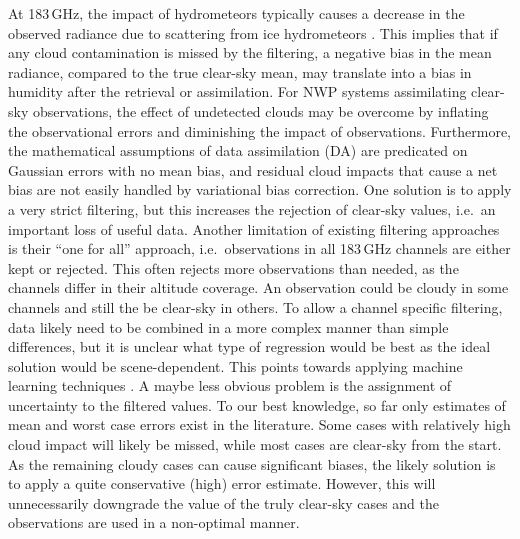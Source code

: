 \documentclass[amt, manuscript]{copernicus}
\begin{document}
At 183\,GHz, the impact of hydrometeors typically causes a decrease in the observed radiance due to scattering from ice hydrometeors \citep[e.g.,][]{barlakas:three:20}. This implies that if any cloud contamination is missed by the filtering, a negative bias in the mean radiance, compared to the true clear-sky mean, may translate into a bias in humidity after the retrieval or assimilation. For NWP systems assimilating clear-sky observations, the effect of undetected clouds may be overcome by inflating the observational errors and diminishing the impact of observations. Furthermore, the mathematical assumptions of data assimilation (DA) are predicated on Gaussian errors with no mean bias, and residual cloud impacts that cause a net bias are not easily handled by variational bias correction. One solution is to apply a very strict filtering, but this increases the rejection of clear-sky values, i.e.\ an important loss of useful data. Another limitation of existing filtering approaches is their ``one for all'' approach, i.e.\ observations in all 183\,GHz channels are either kept or rejected. This often rejects more observations than needed, as the channels differ in their altitude coverage. An observation could be cloudy in some channels and still the be clear-sky in others. To allow a channel specific filtering, data likely need to be combined in a more complex manner than simple differences, but it is unclear what type of regression would be best as the ideal solution would be scene-dependent. This points towards applying machine learning techniques \citep[e.g.,][]{favrichon2019detecting}. A maybe less obvious problem is the assignment of uncertainty to the filtered values. To our best knowledge, so far only estimates of mean and worst case errors exist in the literature. Some cases with relatively high cloud impact will likely be missed, while most cases are clear-sky from the start. As the remaining cloudy cases can cause significant biases, the likely solution is to apply a quite conservative (high) error estimate. However, this will unnecessarily downgrade the value of the truly clear-sky cases and the observations are used in a non-optimal manner.
\end{document}
